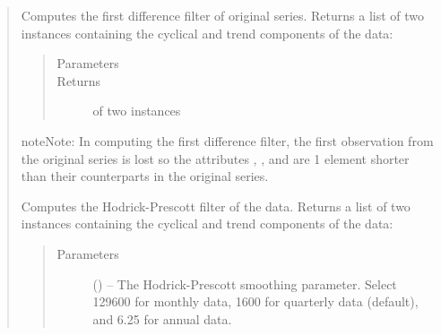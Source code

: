 \documentclass[letterpaper,10pt,openany,oneside,english]{sphinxmanual}
\begin{document}
\begin{fulllineitems}
\begin{quote}

\begin{fulllineitems}
\label{\detokenize{series_class:fredpy.series.firstdiff}}
Computes the first difference filter of original series. Returns a list of two {\hyperref[\detokenize{series_class:fredpy.series}]{}} instances containing the cyclical and trend components of the data:
\begin{quote}

\end{quote}
\begin{quote}\begin{description}
\item[{Parameters}] \leavevmode
\item[{Returns}] \leavevmode
\href{https://docs.python.org/2/library/functions.html\#list}{} of two {\hyperref[\detokenize{series_class:fredpy.series}]{}} instances

\end{description}\end{quote}

\begin{sphinxadmonition}{note}{Note:}
In computing the first difference filter, the first observation from the original series is lost so the attributes , , and  are 1 element shorter than their counterparts in the original series.
\end{sphinxadmonition}

\end{fulllineitems}


\begin{fulllineitems}
\label{\detokenize{series_class:fredpy.series.hpfilter}}
Computes the Hodrick-Prescott filter of the data. Returns a list of two {\hyperref[\detokenize{series_class:fredpy.series}]{}} instances containing the cyclical and trend components of the data:
\begin{quote}

\end{quote}
\begin{quote}\begin{description}
\item[{Parameters}] \leavevmode
{} (\href{https://docs.python.org/2/library/functions.html\#int}{}) -- The Hodrick-Prescott smoothing parameter. Select 129600 for monthly data, 1600 for quarterly data (default), and 6.25 for annual data.


\end{description}
\end{quote}
\end{fulllineitems}
\end{quote}
\end{fulllineitems}
\end{document}
